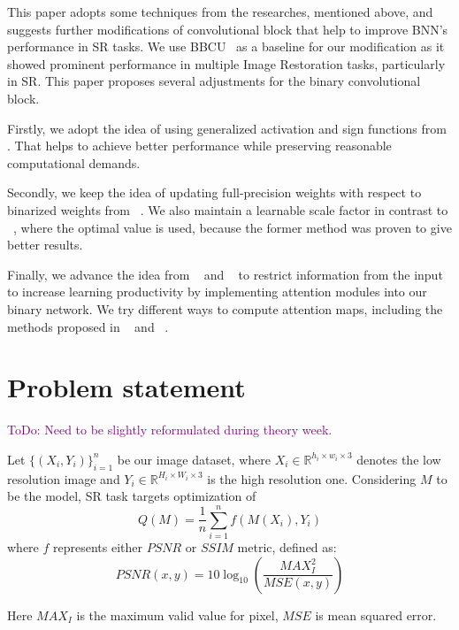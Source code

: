 \documentclass{article}
\newcommand{\TODO}[1]{\textcolor{purple}{ToDo: #1.}}
\begin{document}
This paper adopts some techniques from the researches, mentioned above, and suggests further modifications of convolutional block that help to improve BNN's performance in SR tasks. We use BBCU~\cite{xia2022basic} as a baseline for our modification as it showed prominent performance in multiple Image Restoration tasks, particularly in SR. This paper proposes several adjustments for the binary convolutional block.

Firstly, we adopt the idea of using generalized activation and sign functions from \cite{liu2020reactnet}. That helps to achieve better performance while preserving reasonable computational demands. 

Secondly, we keep the idea of updating full-precision weights with respect to binarized weights from ~\cite{ma2019efficient}. We also maintain a learnable scale factor in contrast to ~\cite{xia2022basic}, where the optimal value is used, because the former method was proven to give better results.

Finally, we advance the idea from ~\cite{xue2022ir2net} and ~\cite{guo2022join} to restrict information from the input to increase learning productivity by implementing attention modules into our binary network. We try different ways to compute attention maps, including the methods proposed in ~\cite{zhao2020efficient} and ~\cite{hu2018squeeze}.

\section{Problem statement}
\label{sec:headings}

\TODO{Need to be slightly reformulated during theory week}

Let $\{(X_i, Y_i)\}_{i=1}^n$ be our image dataset, where $X_i \in \mathbb{R}^{h_i \times w_i \times 3}$ denotes the low resolution image and $Y_i \in \mathbb{R}^{H_i \times W_i \times 3}$ is the high resolution one. Considering $M$ to be the model, SR task targets optimization of 
\begin{equation}
    Q(M) = \frac{1}{n}\sum\limits_{i=1}^nf(M(X_i), Y_i)
\end{equation}
where $f$ represents either $PSNR$ or $SSIM$ metric, defined as:
\begin{equation}
    PSNR(x, y) = 10 \log_{10} \left(\frac{MAX_I^2}{MSE(x, y)}\right)
\end{equation}


Here $MAX_I$ is the maximum valid value for pixel, $MSE$ is mean squared error.
\end{document}

